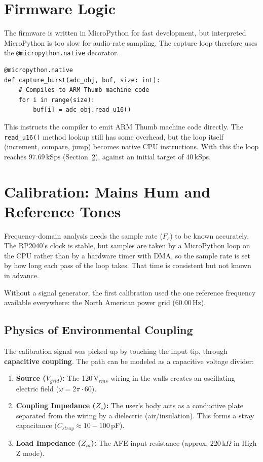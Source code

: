 \documentclass[11pt, a4paper]{report}
\begin{document}
\section{Firmware Logic}
The firmware is written in MicroPython for fast development, but interpreted MicroPython is too slow for audio-rate sampling. The capture loop therefore uses the \lstinline|@micropython.native| decorator.\cite{micropython_speed_python}

\begin{lstlisting}[caption=Native Emitter Capture Loop]
@micropython.native
def capture_burst(adc_obj, buf, size: int):
    # Compiles to ARM Thumb machine code
    for i in range(size):
        buf[i] = adc_obj.read_u16()
\end{lstlisting}

This instructs the compiler to emit ARM Thumb machine code directly.\cite{micropython_speed_python} The \texttt{read\_u16()} method lookup still has some overhead, but the loop itself (increment, compare, jump) becomes native CPU instructions. With this the loop reaches $97.69\,\text{kSps}$ (Section~\ref{sec:calibration}), against an initial target of 40\,kSps.

\section{Calibration: Mains Hum and Reference Tones}
\label{sec:calibration}
Frequency-domain analysis needs the sample rate ($F_s$) to be known accurately. The RP2040's clock is stable, but samples are taken by a MicroPython loop on the CPU rather than by a hardware timer with DMA, so the sample rate is set by how long each pass of the loop takes. That time is consistent but not known in advance.

Without a signal generator, the first calibration used the one reference frequency available everywhere: the North American power grid ($60.00\,\text{Hz}$).

\subsection{Physics of Environmental Coupling}
The calibration signal was picked up by touching the input tip, through \textbf{capacitive coupling}. The path can be modeled as a capacitive voltage divider:
\begin{enumerate}
  \item \textbf{Source ($V_{grid}$):} The 120\,V$_{rms}$ wiring in the walls creates an oscillating electric field ($\omega = 2\pi \cdot 60$).
  \item \textbf{Coupling Impedance ($Z_c$):} The user's body acts as a conductive plate separated from the wiring by a dielectric (air/insulation). This forms a stray capacitance ($C_{stray} \approx 10-100$\,pF).
  \item \textbf{Load Impedance ($Z_{in}$):} The AFE input resistance (approx. $220\,\text{k}\Omega$ in High-Z mode).
\end{enumerate}
\end{document}
